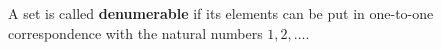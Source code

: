 A set is called \textbf{denumerable} if its elements can be put in one-to-one correspondence with the natural numbers $1, 2, \ldots$.
